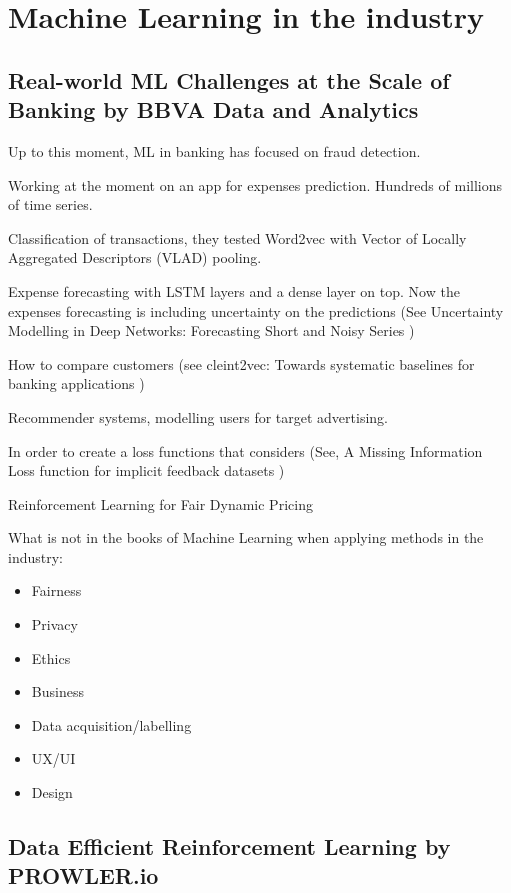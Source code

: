 \documentclass[b5paper]{report}
\begin{document}
\chapter{Machine Learning in the industry}

\section{Real-world ML Challenges at the Scale of Banking by BBVA Data and
Analytics}

Up to this moment, ML in banking has focused on fraud detection.

Working at the moment on an app for expenses prediction. Hundreds of millions
of time series.

Classification of transactions, they tested Word2vec with Vector of Locally
Aggregated Descriptors (VLAD) pooling.

Expense forecasting with LSTM layers and a dense layer on top. Now the expenses
forecasting is including uncertainty on the predictions (See Uncertainty
  Modelling in Deep Networks: Forecasting Short and Noisy Series
\cite{brando2018uncertainty})

How to compare customers (see cleint2vec: Towards systematic baselines for
banking applications \cite{baldassini2018client2vec})

Recommender systems, modelling users for target advertising.

In order to create a loss functions that considers (See, A Missing Information
Loss function for implicit feedback datasets \cite{arevalo2018missing} )

Reinforcement Learning for Fair Dynamic Pricing \cite{maestre2018reinforcement}

What is not in the books of Machine Learning when applying methods in the
industry:

\begin{itemize}
  \item Fairness
  \item Privacy
  \item Ethics
  \item Business
  \item Data acquisition/labelling
  \item UX/UI
  \item Design
\end{itemize}

\section{Data Efficient Reinforcement Learning by PROWLER.io}
\end{document}
